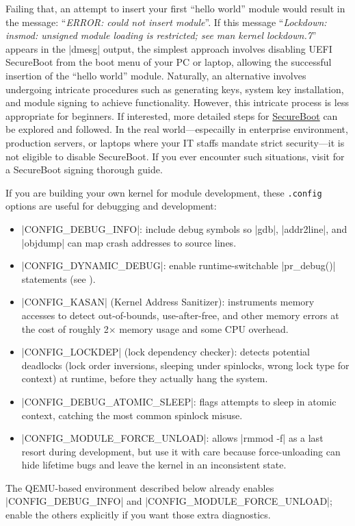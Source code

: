 \documentclass[10pt, oneside]{book}
\begin{document}
\begin{enumerate}
        Failing that, an attempt to insert your first ``hello world'' module would result in the message: ``\emph{ERROR: could not insert module}''.
        If this message ``\emph{Lockdown: insmod: unsigned module loading is restricted;
        see man kernel lockdown.7}'' appears in the \sh|dmesg| output,
        the simplest approach involves disabling UEFI SecureBoot from the boot menu of your PC or laptop,
        allowing the successful insertion of the ``hello world'' module.
        Naturally, an alternative involves undergoing intricate procedures such as generating keys, system key installation,
        and module signing to achieve functionality.
        However, this intricate process is less appropriate for beginners. If interested,
        more detailed steps for \href{https://wiki.debian.org/SecureBoot}{SecureBoot} can be explored and followed.
        In the real world—especailly in enterprise environment, production servers, or laptops where your IT staffs mandate strict security—it is not eligible to disable SecureBoot.
        If you ever encounter such situations, visit  for a SecureBoot signing thorough guide.
\end{enumerate}

If you are building your own kernel for module development, these \verb|.config| options are useful for debugging and development:
\begin{itemize}
  \item \cpp|CONFIG_DEBUG_INFO|: include debug symbols so \sh|gdb|, \sh|addr2line|, and \sh|objdump| can map crash addresses to source lines.
  \item \cpp|CONFIG_DYNAMIC_DEBUG|: enable runtime-switchable \cpp|pr_debug()| statements (see ).
  \item \cpp|CONFIG_KASAN| (Kernel Address Sanitizer): instruments memory accesses to detect out-of-bounds, use-after-free, and other memory errors at the cost of roughly 2$\times$ memory usage and some CPU overhead.
  \item \cpp|CONFIG_LOCKDEP| (lock dependency checker): detects potential deadlocks (lock order inversions, sleeping under spinlocks, wrong lock type for context) at runtime, before they actually hang the system.
  \item \cpp|CONFIG_DEBUG_ATOMIC_SLEEP|: flags attempts to sleep in atomic context, catching the most common spinlock misuse.
  \item \cpp|CONFIG_MODULE_FORCE_UNLOAD|: allows \sh|rmmod -f| as a last resort during development, but use it with care because force-unloading can hide lifetime bugs and leave the kernel in an inconsistent state.
\end{itemize}
The QEMU-based environment described below already enables
\cpp|CONFIG_DEBUG_INFO| and \cpp|CONFIG_MODULE_FORCE_UNLOAD|; enable the
others explicitly if you want those extra diagnostics.
\end{document}
